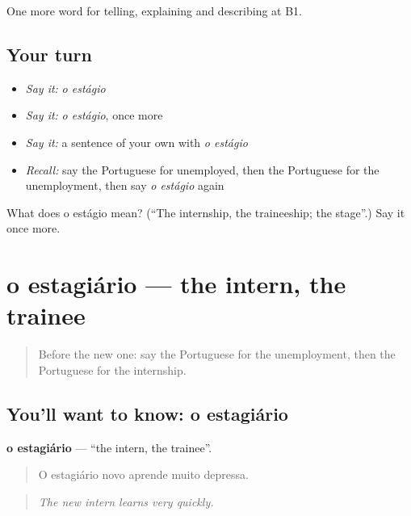\begin{grammarlens}[title={What you've built}]
One more word for telling, explaining and describing at B1.
\end{grammarlens}

\subsection*{Your turn}
\begin{itemize}
\raggedright
  \item \emph{Say it:} \emph{o estágio}
  \item \emph{Say it:} \emph{o estágio}, once more
  \item \emph{Say it:} a sentence of your own with \emph{o estágio}
  \item \emph{Recall:} say the Portuguese for unemployed, then the Portuguese for the unemployment, then say \emph{o estágio} again
\end{itemize}

\begin{tcolorbox}[breakable,colback=teal!4,colframe=teal!35!black,title={Before you move on}]
What does o estágio mean? (\textquotedblleft{}The internship, the traineeship; the stage\textquotedblright{}.) Say it once more.
\end{tcolorbox}
\section[o estagiário]{o estagiário — the intern, the trainee}

\label{lesson:PT-C357-estagiario}



\begin{quote}
Before the new one: say the Portuguese for the unemployment, then the Portuguese for the internship.
\end{quote}

\subsection*{You'll want to know: o estagiário}
\textbf{o estagiário} — \textquotedblleft{}the intern, the trainee\textquotedblright{}.

\begin{quote}
O estagiário novo aprende muito depressa.
\end{quote}

\begin{quote}
\emph{The new intern learns very quickly.}
\end{quote}

